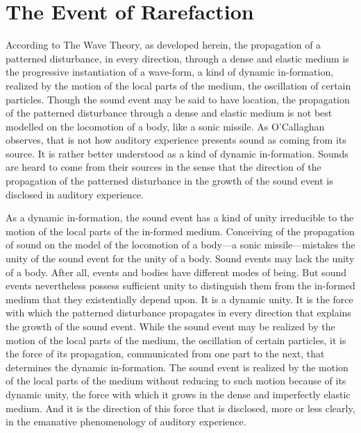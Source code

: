 \documentclass[12pt]{article}
\begin{document}

\section{The Event of Rarefaction} %
\label{sec:the_event_of_rarefaction}

According to The Wave Theory, as developed herein, the propagation of a patterned disturbance, in every direction, through a dense and elastic medium is the progressive instantiation of a wave-form, a kind of dynamic in-formation, realized by the motion of the local parts of the medium, the oscillation of certain particles. Though the sound event may be said to have location, the propagation of the patterned disturbance through a dense and elastic medium is not best modelled on the locomotion of a body, like a sonic missile. As O’Callaghan observes, that is not how auditory experience presents sound as coming from its source. It is rather better understood as a kind of dynamic in-formation. Sounds are heard to come from their sources in the sense that the direction of the propagation of the patterned disturbance in the growth of the sound event is disclosed in auditory experience. 

As a dynamic in-formation, the sound event has a kind of unity irreducible to the motion of the local parts of the in-formed medium. Conceiving of the propagation of sound on the model of the locomotion of a body—a sonic missile—mistakes the unity of the sound event for the unity of a body. Sound events may lack the unity of a body. After all, events and bodies have different modes of being. But sound events nevertheless possess sufficient unity to distinguish them from the in-formed medium that they existentially depend upon. It is a dynamic unity. It is the force with which the patterned disturbance propagates in every direction that explains the growth of the sound event. While the sound event may be realized by the motion of the local parts of the medium, the oscillation of certain particles, it is the force of its propagation, communicated from one part to the next, that determines the dynamic in-formation. The sound event is realized by the motion of the local parts of the medium without reducing to such motion because of its dynamic unity, the force with which it grows in the dense and imperfectly elastic medium. And it is the direction of this force that is disclosed, more or less clearly, in the emanative phenomenology of auditory experience.



\nocite{Shields:2016ix}
\nocite{Hett:1936fk}

 
 
\end{document}
